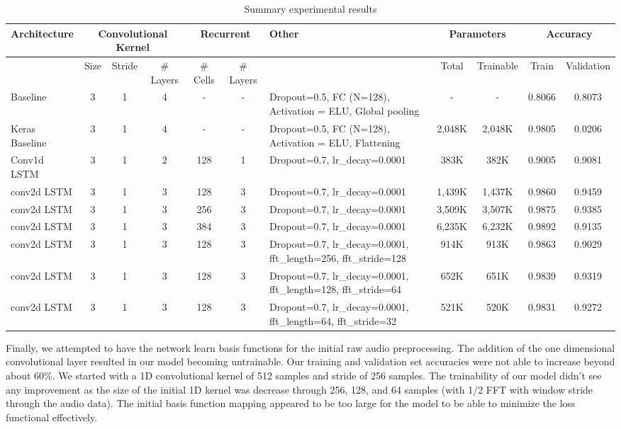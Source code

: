 \documentclass{article}
\begin{document}
\begin{table}[!htbp]
  \resizebox{\textwidth}{!} {
    \begin{tabular} { |m{3cm}|c|c|c|c|c|m{3cm}|c|c|c|c| }
      \hline
      Architecture & \multicolumn{3}{|c|}{Convolutional Kernel} &
      \multicolumn{2}{|c|}{Recurrent} & Other &
      \multicolumn{2}{|c|}{Parameters} & \multicolumn{2}{|c|}{Accuracy} \\
      \hline
      & Size & Stride & \# Layers &
      \# Cells & \# Layers & &
      Total & Trainable & Train & Validation \\ \hline
      \hline
      Baseline & 3 & 1 & 4 &
      - & - & Dropout=0.5, FC (N=128), Activation =
      ELU, Global pooling &
      - & - & 0.8066 & 0.8073 \\ \hline
      \hline
      Keras Baseline & 3 & 1 & 4 &
      - & - & Dropout=0.5, FC (N=128), Activation =
      ELU, Flattening &
      2,048K & 2,048K & 0.9805 & 0.0206 \\ \hline
      \hline
      Conv1d LSTM & 3 & 1 & 2 &
      128 & 1 & Dropout=0.7, lr\_decay=0.0001 &
      383K & 382K & 0.9005 & 0.9081 \\ \hline
      \hline
      conv2d LSTM & 3 & 1 & 3 &
      128 & 3 & Dropout=0.7, lr\_decay=0.0001 &
      1,439K & 1,437K & 0.9860 & 0.9459 \\ \hline
      \hline
      conv2d LSTM & 3 & 1 & 3 &
      256 & 3 & Dropout=0.7, lr\_decay=0.0001 &
      3,509K & 3,507K & 0.9875 & 0.9385 \\ \hline
      conv2d LSTM & 3 & 1 & 3 &
      384 & 3 & Dropout=0.7, lr\_decay=0.0001 &
      6,235K & 6,232K & 0.9892 & 0.9135 \\ \hline
      \hline
      conv2d LSTM & 3 & 1 & 3 &
      128 & 3 & Dropout=0.7, lr\_decay=0.0001,
      fft\_length=256, fft\_stride=128 &
      914K & 913K & 0.9863 & 0.9029 \\ \hline
      conv2d LSTM & 3 & 1 & 3 &
      128 & 3 & Dropout=0.7, lr\_decay=0.0001,
      fft\_length=128, fft\_stride=64 &
      652K & 651K & 0.9839 & 0.9319 \\ \hline
      conv2d LSTM & 3 & 1 & 3 &
      128 & 3 & Dropout=0.7, lr\_decay=0.0001,
      fft\_length=64, fft\_stride=32 &
      521K & 520K & 0.9831 & 0.9272 \\ \hline
    \end{tabular}
  }
  \caption{Summary experimental results}
  \label{tab:summary-results}
\end{table}
Finally, we attempted to have the network learn basis functions for
the initial raw audio preprocessing. The addition of the one
dimensional convolutional layer resulted in our model becoming
untrainable. Our training and validation set accuracies were not able
to increase beyond about 60\%. We started with a 1D convolutional
kernel of 512 samples and stride of 256 samples. The trainability of
our model didn't see any improvement as the size of the initial 1D
kernel was decrease through 256, 128, and 64 samples (with 1/2 FFT
with window stride through the audio data). The initial basis function
mapping appeared to be too large for the model to be able to minimize
the loss functional effectively.
\end{document}
